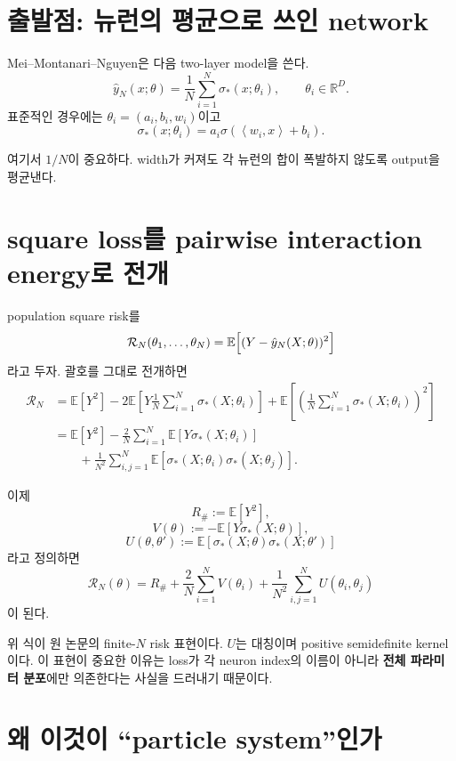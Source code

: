 \documentclass[11pt,a4paper,oneside,openany]{memoir}
\newcommand{\R}{\mathbb{R}}
\newcommand{\Risk}{\mathcal{R}}
\newcommand{\E}{\mathbb{E}}
\newcommand{\inner}[2]{\left\langle #1,#2\right\rangle}
\theoremstyle{definition}
\begin{document}
\section{출발점: 뉴런의 평균으로 쓰인 network}

Mei--Montanari--Nguyen은 다음 two-layer model을 쓴다.
\[
  \hat y_N(x;\theta)
  =\frac1N\sum_{i=1}^{N}\sigma_*(x;\theta_i),
  \qquad \theta_i\in\R^D.
\]
표준적인 경우에는 $\theta_i=(a_i,b_i,w_i)$이고
\[
  \sigma_*(x;\theta_i)=a_i\sigma(\inner{w_i}{x}+b_i).
\]

여기서 $1/N$이 중요하다. width가 커져도 각 뉴런의 합이 폭발하지 않도록 output을 평균낸다.

\section{square loss를 pairwise interaction energy로 전개}

population square risk를
\[
  \Risk_N(\theta_1,\ldots,\theta_N)
  =\E\Bigl[(Y-\hat y_N(X;\theta))^2\Bigr]
\]
라고 두자. 괄호를 그대로 전개하면
\begin{align*}
\Risk_N
&=\E[Y^2]
  -2\E\left[Y\frac1N\sum_{i=1}^N\sigma_*(X;\theta_i)\right]
  +\E\left[\left(\frac1N\sum_{i=1}^N\sigma_*(X;\theta_i)\right)^2\right]\\
&=\E[Y^2]
  -\frac{2}{N}\sum_{i=1}^N \E[Y\sigma_*(X;\theta_i)]\\
&\qquad
  +\frac1{N^2}\sum_{i,j=1}^N
  \E[\sigma_*(X;\theta_i)\sigma_*(X;\theta_j)].
\end{align*}

이제
\[
  R_\#:=\E[Y^2],
\]
\[
  V(\theta):=-\E[Y\sigma_*(X;\theta)],
\]
\[
  U(\theta,\theta')
  :=\E[\sigma_*(X;\theta)\sigma_*(X;\theta')]
\]
라고 정의하면
\begin{equation}
\boxed{
  \Risk_N(\theta)
  =R_\#+\frac{2}{N}\sum_{i=1}^N V(\theta_i)
  +\frac1{N^2}\sum_{i,j=1}^N U(\theta_i,\theta_j)
}
\label{eq:finite-risk}
\end{equation}
이 된다.

\begin{paperbox}[--- Mei et al., Eq. (4)]
위 식이 원 논문의 finite-$N$ risk 표현이다. $U$는 대칭이며 positive semidefinite kernel이다.
이 표현이 중요한 이유는 loss가 각 neuron index의 이름이 아니라 \textbf{전체 파라미터 분포}에만
의존한다는 사실을 드러내기 때문이다.
\end{paperbox}

\section{왜 이것이 ``particle system''인가}
\end{document}
